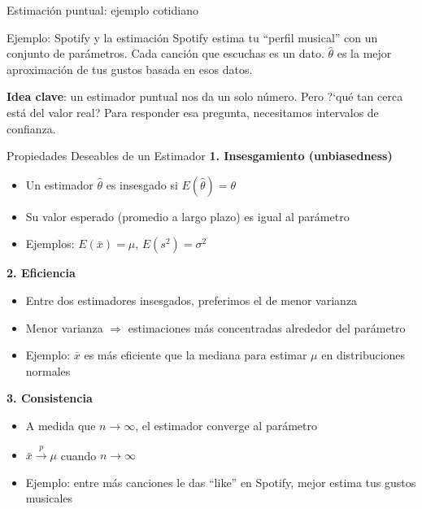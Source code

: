 \documentclass[aspectratio=169, 11pt]{beamer}
\begin{document}
\begin{frame}{Estimaci\'on puntual: ejemplo cotidiano}
\begin{exampleblock}{Ejemplo: Spotify y la estimaci\'on}
Spotify estima tu ``perfil musical'' con un conjunto de par\'ametros. Cada canci\'on que escuchas es un dato. $\hat{\theta}$ es la mejor aproximaci\'on de tus gustos basada en esos datos.
\end{exampleblock}

\vspace{0.5em}
\textbf{Idea clave}: un estimador puntual nos da un solo n\'umero. Pero ?`qu\'e tan cerca est\'a del valor real? Para responder esa pregunta, necesitamos \alert{intervalos de confianza}.
\end{frame}

\begin{frame}{Propiedades Deseables de un Estimador}
\textbf{1. Insesgamiento (unbiasedness)}
\begin{itemize}
  \item Un estimador $\hat{\theta}$ es insesgado si $E(\hat{\theta}) = \theta$
  \item Su valor esperado (promedio a largo plazo) es igual al parámetro
  \item Ejemplos: $E(\bar{x}) = \mu$, $E(s^2) = \sigma^2$
\end{itemize}

\vspace{0.3cm}
\textbf{2. Eficiencia}
\begin{itemize}
  \item Entre dos estimadores insesgados, preferimos el de \alert{menor varianza}
  \item Menor varianza $\Rightarrow$ estimaciones más concentradas alrededor del parámetro
  \item Ejemplo: $\bar{x}$ es más eficiente que la mediana para estimar $\mu$ en distribuciones normales
\end{itemize}

\vspace{0.3cm}
\textbf{3. Consistencia}
\begin{itemize}
  \item A medida que $n \to \infty$, el estimador converge al par\'ametro
  \item $\bar{x} \xrightarrow{p} \mu$ cuando $n \to \infty$
  \item Ejemplo: entre m\'as canciones le das ``like'' en Spotify, mejor estima tus gustos musicales
\end{itemize}
\end{frame}
\end{document}
